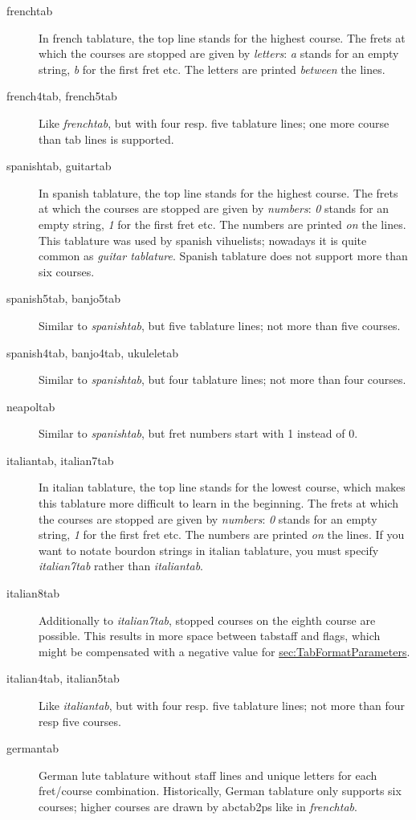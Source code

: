 \documentclass[a4paper]{article}
\begin{document}
\begin{description}
\item[frenchtab] In french tablature, the top line stands for the
highest course. The frets at which the courses are stopped are given
by {\it letters}: {\it a} stands for an empty string, {\it b} for the first
fret etc. The letters are printed {\it between} the lines.

\item[french4tab, french5tab] Like {\it frenchtab}, but with four resp.
five tablature lines; one more course than tab lines is supported.

\item[spanishtab, guitartab] In spanish tablature, the top line stands for the
highest course. The frets at which the courses are stopped are given
by {\it numbers}: {\it 0} stands for an empty string, {\it 1} for the first
fret etc. The numbers are printed {\it on} the lines. This tablature 
was used by spanish vihuelists; nowadays it
is quite common as {\it guitar tablature}. Spanish tablature does not
support more than six courses.

\item[spanish5tab, banjo5tab] Similar to {\it spanishtab}, but five tablature
lines; not more than five courses.

\item[spanish4tab, banjo4tab, ukuleletab] Similar to {\it spanishtab}, but 
four tablature lines; not more than four courses.

\item[neapoltab] Similar to {\it spanishtab}, but fret numbers start with 1
instead of 0.

\item[italiantab, italian7tab] In italian tablature, the top line stands 
for the lowest course, which makes this tablature more difficult to learn 
in the beginning. The frets at which the courses are stopped are given
by {\it numbers}: {\it 0} stands for an empty string, {\it 1} for the first
fret etc. The numbers are printed {\it on} the lines. If you want
to notate bourdon strings in italian tablature, you must specify
{\it italian7tab} rather than {\it italiantab}.

\item[italian8tab] Additionally to {\it italian7tab}, stopped courses on
the eighth course are possible. This results in more space between
tabstaff and flags, which might be compensated with a negative value
for \hyperref{\%\%tabflagspace}{{\it \%\%tabflagspace} (see section }{)}{sec:TabFormatParameters}.

\item[italian4tab, italian5tab] Like {\it italiantab}, but with four resp.
five tablature lines; not more than four resp five courses.

\item[germantab] German lute tablature without staff lines and unique
  letters for each fret/course combination. Historically, German tablature
  only supports six courses; higher courses are drawn by abctab2ps like
  in {\em frenchtab}.

\end{description}
\end{document}
